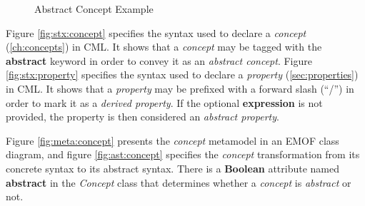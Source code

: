 \begin{figure}
\verbatimfont{\small}

\caption{Abstract Concept Example}
\label{fig:ex:abstract}
\end{figure}

\begin{concrete-syntax}
Figure \ref{fig:stx:concept} specifies the syntax used
to declare a \emph{concept} (\ref{ch:concepts}) in CML.
It shows that a \emph{concept} may be tagged with the \textbf{abstract} keyword
in order to convey it as an \emph{abstract concept}.
Figure \ref{fig:stx:property} specifies the syntax used 
to declare a \emph{property} (\ref{sec:properties}) in CML.
It shows that a \emph{property} may be prefixed with a forward slash (``/'')
in order to mark it as a \emph{derived property}.
If the optional \textbf{expression} is not provided,
the property is then considered an \emph{abstract property}.
\end{concrete-syntax}

\begin{abstract-syntax}
Figure \ref{fig:meta:concept} presents the \emph{concept} metamodel
in an EMOF \cite{mof} class diagram,
and figure \ref{fig:ast:concept} specifies
the \emph{concept} transformation
from its concrete syntax to its abstract syntax.
There is a \textbf{Boolean} attribute named \textbf{abstract} in the \emph{Concept} class
that determines whether a \emph{concept} is \emph{abstract} or not.
\end{abstract-syntax}

